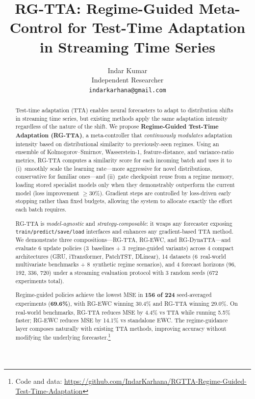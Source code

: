 \documentclass[11pt,a4paper]{article}
\title{RG-TTA: Regime-Guided Meta-Control for Test-Time Adaptation\\in Streaming Time Series}
\author{
  Indar Kumar \\  
  Independent Researcher \\
  \texttt{indarkarhana@gmail.com}
}
\date{}
\newcommand{\repourl}{\url{https://github.com/IndarKarhana/RGTTA-Regime-Guided-Test-Time-Adaptation}}
\begin{document}
\maketitle

\begin{abstract}

Test-time adaptation (TTA) enables neural forecasters to adapt to distribution shifts in streaming time series, but existing methods apply the same adaptation intensity regardless of the nature of the shift. We propose \textbf{Regime-Guided Test-Time Adaptation (RG-TTA)}, a meta-controller that \emph{continuously modulates} adaptation intensity based on distributional similarity to previously-seen regimes. Using an ensemble of Kolmogorov--Smirnov, Wasserstein-1, feature-distance, and variance-ratio metrics, RG-TTA computes a similarity score for each incoming batch and uses it to (i)~smoothly scale the learning rate---more aggressive for novel distributions, conservative for familiar ones---and (ii)~gate checkpoint reuse from a regime memory, loading stored specialist models only when they demonstrably outperform the current model (loss improvement $\geq$30\%). Gradient steps are controlled by loss-driven early stopping rather than fixed budgets, allowing the system to allocate exactly the effort each batch requires.

RG-TTA is \emph{model-agnostic} and \emph{strategy-composable}: it wraps any forecaster exposing \texttt{train/predict/save/load} interfaces and enhances any gradient-based TTA method. We demonstrate three compositions---RG-TTA, RG-EWC, and RG-DynaTTA---and evaluate 6 update policies (3~baselines + 3~regime-guided variants) across 4 compact architectures (GRU, iTransformer, PatchTST, DLinear), 14 datasets (6~real-world multivariate benchmarks + 8~synthetic regime scenarios), and 4 forecast horizons (96, 192, 336, 720) under a streaming evaluation protocol with 3 random seeds (672 experiments total).

Regime-guided policies achieve the lowest MSE in \textbf{156 of 224} seed-averaged experiments (\textbf{69.6\%}), with RG-EWC winning 30.4\% and RG-TTA winning 29.0\%. On real-world benchmarks, RG-TTA reduces MSE by 4.4\% vs TTA while running 5.5\% faster; RG-EWC reduces MSE by 14.1\% vs standalone EWC. The regime-guidance layer composes naturally with existing TTA methods, improving accuracy without modifying the underlying forecaster.\footnote{Code and data: \repourl}

\end{abstract}
\end{document}
